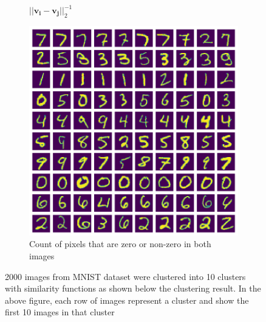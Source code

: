 \documentclass[10pt,a4paper, nocenter]{report}
\begin{document}
\begin{enumerate}
\begin{figure}[h]
\begin{center}
\begin{subfigure}[b]{0.3\textwidth}
                    \caption{$\lvert \lvert \mathbf{v_i} - \mathbf{v_j} \rvert \rvert_2^{-1}$ \vspace{10pt} }
                    \label{fig:clustering_10_2norm}
                \end{subfigure}           
                \begin{subfigure}[b]{0.3\textwidth}
                    \centering
                    \includegraphics[width=\textwidth]{../../images/number_clustering_10_hamming.png}
                    \caption{Count of pixels that are zero or non-zero in both images}
                    \label{fig:clustering_10_hamming}
                \end{subfigure}           
            \end{center}
            \caption{2000 images from MNIST dataset were clustered into 10 clusters with similarity functions as shown below the clustering result. In the above figure, each row of images represent a cluster and show the first 10 images in that cluster}
            \label{fig:mnist10ClusterImages}
        \end{figure}


\end{enumerate}
\end{document}
